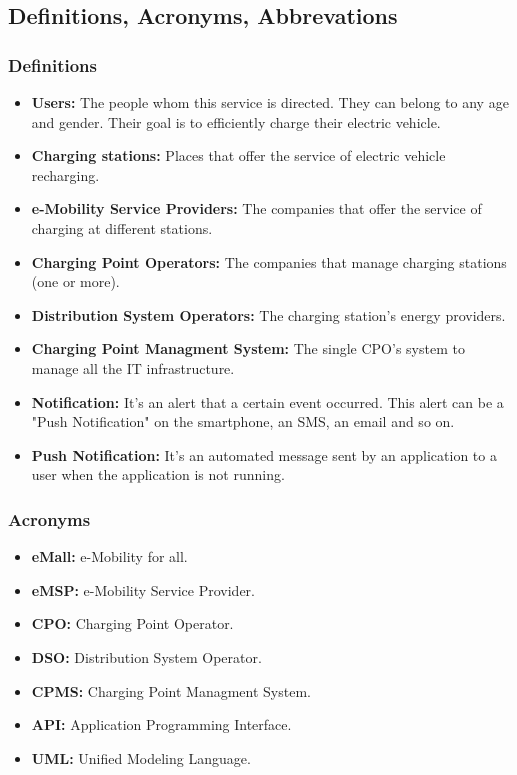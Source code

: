 \subsection{Definitions, Acronyms, Abbrevations}
\subsubsection{Definitions}
\begin{itemize}
        \item \textbf{Users:} The people whom this service is directed. 
        They can belong to any age and gender. \label{Users}
        Their goal is to efficiently charge their electric vehicle.
        \item \textbf{Charging stations:} Places that offer the service of electric vehicle recharging.
        \item \textbf{e-Mobility Service Providers:} The companies that offer the service of charging at different stations.
        \item \textbf{Charging Point Operators:} The companies that manage charging stations (one or more).
        \item \textbf{Distribution System Operators:} The charging station's energy providers.
        \item \textbf{Charging Point Managment System:} The single CPO's system to manage all the IT infrastructure.
        \item \textbf{Notification:} It's an alert that a certain event occurred. 
        This alert can be a "Push Notification" on the smartphone, an SMS, an email and so on.
        \item \textbf{Push Notification:} It's an automated message sent by an application to a user when the application is not running.
\end{itemize}
\subsubsection{Acronyms}
\begin{itemize}
        \item \textbf{eMall:} e-Mobility for all.
        \item \textbf{eMSP:} e-Mobility Service Provider.
        \item \textbf{CPO:} Charging Point Operator.
        \item \textbf{DSO:} Distribution System Operator.
        \item \textbf{CPMS:} Charging Point Managment System.
        \item \textbf{API:} Application Programming Interface.
        \item \textbf{UML:} Unified Modeling Language.
\end{itemize}
